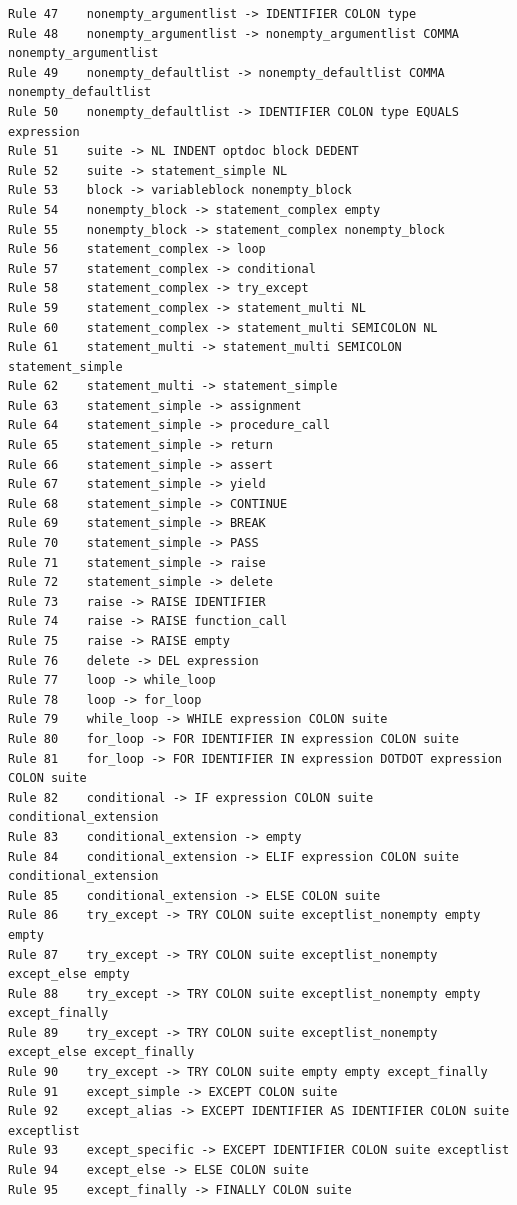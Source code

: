 \documentclass{article}
\begin{document}
\begin{verbatim}
Rule 47    nonempty_argumentlist -> IDENTIFIER COLON type
Rule 48    nonempty_argumentlist -> nonempty_argumentlist COMMA nonempty_argumentlist
Rule 49    nonempty_defaultlist -> nonempty_defaultlist COMMA nonempty_defaultlist
Rule 50    nonempty_defaultlist -> IDENTIFIER COLON type EQUALS expression
Rule 51    suite -> NL INDENT optdoc block DEDENT
Rule 52    suite -> statement_simple NL
Rule 53    block -> variableblock nonempty_block
Rule 54    nonempty_block -> statement_complex empty
Rule 55    nonempty_block -> statement_complex nonempty_block
Rule 56    statement_complex -> loop
Rule 57    statement_complex -> conditional
Rule 58    statement_complex -> try_except
Rule 59    statement_complex -> statement_multi NL
Rule 60    statement_complex -> statement_multi SEMICOLON NL
Rule 61    statement_multi -> statement_multi SEMICOLON statement_simple
Rule 62    statement_multi -> statement_simple
Rule 63    statement_simple -> assignment
Rule 64    statement_simple -> procedure_call
Rule 65    statement_simple -> return
Rule 66    statement_simple -> assert
Rule 67    statement_simple -> yield
Rule 68    statement_simple -> CONTINUE
Rule 69    statement_simple -> BREAK
Rule 70    statement_simple -> PASS
Rule 71    statement_simple -> raise
Rule 72    statement_simple -> delete
Rule 73    raise -> RAISE IDENTIFIER
Rule 74    raise -> RAISE function_call
Rule 75    raise -> RAISE empty
Rule 76    delete -> DEL expression
Rule 77    loop -> while_loop
Rule 78    loop -> for_loop
Rule 79    while_loop -> WHILE expression COLON suite
Rule 80    for_loop -> FOR IDENTIFIER IN expression COLON suite
Rule 81    for_loop -> FOR IDENTIFIER IN expression DOTDOT expression COLON suite
Rule 82    conditional -> IF expression COLON suite conditional_extension
Rule 83    conditional_extension -> empty
Rule 84    conditional_extension -> ELIF expression COLON suite conditional_extension
Rule 85    conditional_extension -> ELSE COLON suite
Rule 86    try_except -> TRY COLON suite exceptlist_nonempty empty empty
Rule 87    try_except -> TRY COLON suite exceptlist_nonempty except_else empty
Rule 88    try_except -> TRY COLON suite exceptlist_nonempty empty except_finally
Rule 89    try_except -> TRY COLON suite exceptlist_nonempty except_else except_finally
Rule 90    try_except -> TRY COLON suite empty empty except_finally
Rule 91    except_simple -> EXCEPT COLON suite
Rule 92    except_alias -> EXCEPT IDENTIFIER AS IDENTIFIER COLON suite exceptlist
Rule 93    except_specific -> EXCEPT IDENTIFIER COLON suite exceptlist
Rule 94    except_else -> ELSE COLON suite
Rule 95    except_finally -> FINALLY COLON suite

\end{verbatim}
\end{document}
